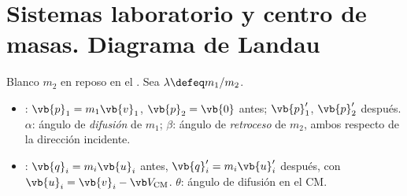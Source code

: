 \section{Sistemas laboratorio y centro de masas. Diagrama de Landau}
\label{sec:landau}

\begin{notacion}[Diapositivas]
\label{not:lab-cm}
Blanco $m_{2}$ en reposo en el \lab. Sea $\lambda\defeq m_{1}/m_{2}$.
\begin{itemize}[leftmargin=1.3em]
  \item \emph{\lab}: $\vb{p}_{1}=m_{1}\vb{v}_{1}$, $\vb{p}_{2}=\vb{0}$ antes; $\vb{p}_{1}'$, $\vb{p}_{2}'$ después.
        $\alpha$: ángulo de \emph{difusión} de $m_{1}$; $\beta$: ángulo de \emph{retroceso} de $m_{2}$, ambos
        respecto de la dirección incidente.
  \item \emph{\scm}: $\vb{q}_{i}=m_{i}\vb{u}_{i}$ antes, $\vb{q}_{i}'=m_{i}\vb{u}_{i}'$ después, con
        $\vb{u}_{i}=\vb{v}_{i}-\Vcm$. $\theta$: ángulo de difusión en el CM.
\end{itemize}
\end{notacion}

